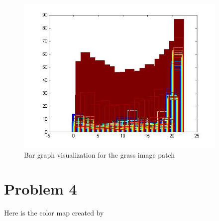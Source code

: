 \documentclass[11pt,psfig]{article}
\begin{document}
\begin{figure}[H]
\centering
\includegraphics[height=3in]{prob3patch3bar.jpg}
\caption{Bar graph visualization for the grass image patch}
\end{figure}

\newpage

\section*{Problem 4}

Here is the color map created by 
\end{document}
